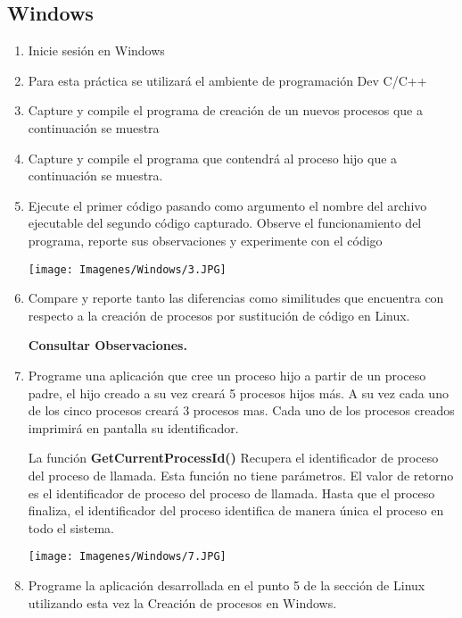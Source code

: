 \documentclass[12pt]{article}
\begin{document}
\subsection{Windows}
    \begin{enumerate}
        \item Inicie sesión en Windows
        \item Para esta práctica se utilizará el ambiente de programación Dev C/C++
        \item Capture y compile el programa de creación de un nuevos procesos que a continuación se muestra\\
        
            
        \item Capture y compile el programa que contendrá al proceso hijo que a continuación se muestra.
            
        \newpage
        \item Ejecute el primer código pasando como argumento el nombre del archivo ejecutable del segundo código capturado. Observe el funcionamiento del programa, reporte sus observaciones y experimente con el código
        \begin{center}
            \texttt{[image: Imagenes/Windows/3.JPG]}
        \end{center}
        \item Compare y reporte tanto las diferencias como similitudes que encuentra con respecto a la creación de procesos por sustitución de código en Linux. 
        
        \textbf{Consultar Observaciones.}
        
        \item Programe una aplicación que cree un proceso hijo a partir de un proceso padre, el hijo creado a su vez creará 5 procesos hijos más. A su vez cada uno de los cinco procesos creará 3 procesos mas. Cada uno de los procesos creados imprimirá en pantalla su identificador.
        
        
        La función \textbf{GetCurrentProcessId()} Recupera el identificador de proceso del proceso de llamada. Esta función no tiene parámetros. El valor de retorno es el identificador de proceso del proceso de llamada. Hasta que el proceso finaliza, el identificador del proceso identifica de manera única el proceso en todo el sistema.
        \begin{center}
            \texttt{[image: Imagenes/Windows/7.JPG]}
        \end{center}
        \newpage
        \item Programe la aplicación desarrollada en el punto 5 de la sección de Linux utilizando esta vez la Creación de procesos en Windows.
        

\end{enumerate}
\end{document}
